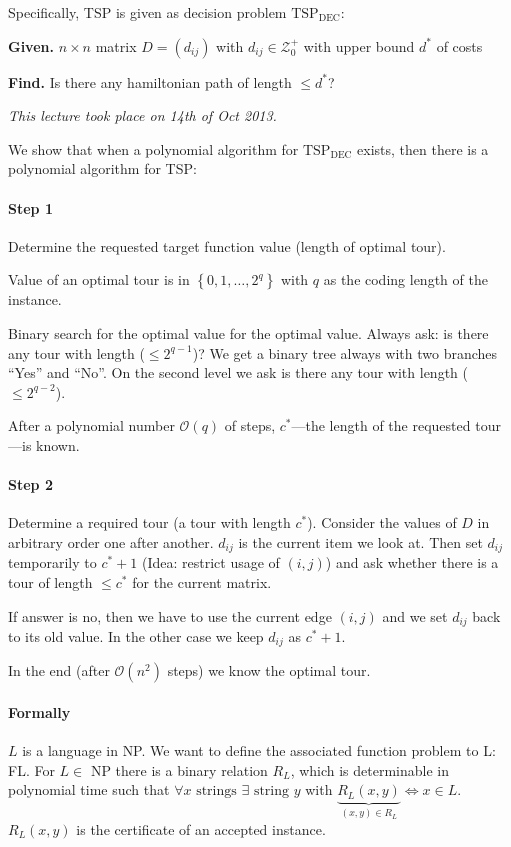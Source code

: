 \documentclass[a4paper]{article}
\newcommand{\given}[1]{\textbf{Given.} #1\par}
\newcommand{\find}[1]{\textbf{Find.} #1\par}
\newcommand{\cls}[1]{\rm{#1}}
\newcommand{\set}[1]{\left\{#1\right\}}
\newcommand{\dateref}[1]{\emph{This lecture took place on #1.}\par}
\newenvironment{spec}[0]{\begin{framed}}{\end{framed}}
\begin{document}
Specifically, TSP is given as decision problem $\text{TSP}_{\text{DEC}}$:
\begin{spec}
  \given{$n \times n$ matrix $D = (d_{ij})$ with $d_{ij} \in \mathcal{Z}_0^+$ with upper bound $d^*$ of costs}
  \find{Is there any hamiltonian path of length $\leq d^*$?}
\end{spec}

\dateref{14th of Oct 2013}

We show that when a polynomial algorithm for $\text{TSP}_{\text{DEC}}$ exists, then there is a polynomial algorithm for TSP:

\paragraph{Step 1}
Determine the requested target function value (length of optimal tour).

Value of an optimal tour is in $\set{0,1,\ldots,2^q}$ with $q$ as the coding length
of the instance.

Binary search for the optimal value for the optimal value. Always ask:
is there any tour with length ($\leq 2^{q-1}$)? We get a binary tree always
with two branches ``Yes'' and ``No''. On the second level we ask is there any
tour with length ($\leq 2^{q-2}$).

After a polynomial number $\mathcal{O}(q)$ of steps, %
$c^*$---the length of the requested tour---is known.

\paragraph{Step 2}
Determine a required tour (a tour with length $c^*$).
Consider the values of $D$ in arbitrary order one after another.
$d_{ij}$ is the current item we look at. Then set $d_{ij}$ temporarily to $c^* + 1$
(Idea: restrict usage of $(i,j)$) and ask whether there is a tour of length $\leq c^*$
for the current matrix.

If answer is no, then we have to use the current edge $(i,j)$ and we set $d_{ij}$ back
to its old value. In the other case we keep $d_{ij}$ as $c^* + 1$.

In the end (after $\mathcal{O}(n^2)$ steps) we know the optimal tour.

\paragraph{Formally}
$L$ is a language in \cls{NP}. We want to define the associated function problem to L: FL.
For $L \in $ \cls{NP} there is a binary relation $R_L$, which is determinable in polynomial
time such that $\forall x \text{ strings } \exists \text{ string } y$ with
$\underbrace{R_L(x,y)}_{(x,y) \in R_L} \Leftrightarrow x \in L$. $R_L(x,y)$ is the
certificate of an accepted instance. 
\end{document}
